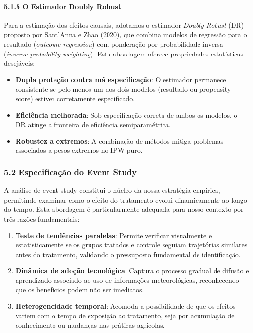 \documentclass[
  brazilian,
  12pt,
  a4paper,
]{article}
\providecommand{\tightlist}{%
  \setlength{\itemsep}{0pt}\setlength{\parskip}{0pt}}
\begin{document}
\paragraph{\texorpdfstring{\textbf{5.1.5 O Estimador Doubly
Robust}}{5.1.5 O Estimador Doubly Robust}}\label{o-estimador-doubly-robust}

Para a estimação dos efeitos causais, adotamos o estimador \emph{Doubly
Robust} (DR) proposto por Sant'Anna e Zhao (2020), que combina modelos
de regressão para o resultado (\emph{outcome regression}) com ponderação
por probabilidade inversa (\emph{inverse probability weighting}). Esta
abordagem oferece propriedades estatísticas desejáveis:

\begin{itemize}
\tightlist
\item
  \textbf{Dupla proteção contra má especificação}: O estimador permanece
  consistente se pelo menos um dos dois modelos (resultado ou propensity
  score) estiver corretamente especificado.
\item
  \textbf{Eficiência melhorada}: Sob especificação correta de ambos os
  modelos, o DR atinge a fronteira de eficiência semiparamétrica.
\item
  \textbf{Robustez a extremos}: A combinação de métodos mitiga problemas
  associados a pesos extremos no IPW puro.
\end{itemize}

\subsubsection{\texorpdfstring{\textbf{5.2 Especificação do Event
Study}}{5.2 Especificação do Event Study}}\label{especificauxe7uxe3o-do-event-study}

A análise de event study constitui o núcleo da nossa estratégia
empírica, permitindo examinar como o efeito do tratamento evolui
dinamicamente ao longo do tempo. Esta abordagem é particularmente
adequada para nosso contexto por três razões fundamentais:

\begin{enumerate}
\def\labelenumi{\arabic{enumi}.}
\item
  \textbf{Teste de tendências paralelas}: Permite verificar visualmente
  e estatisticamente se os grupos tratados e controle seguiam
  trajetórias similares antes do tratamento, validando o pressuposto
  fundamental de identificação.
\item
  \textbf{Dinâmica de adoção tecnológica}: Captura o processo gradual de
  difusão e aprendizado associado ao uso de informações meteorológicas,
  reconhecendo que os benefícios podem não ser imediatos.
\item
  \textbf{Heterogeneidade temporal}: Acomoda a possibilidade de que os
  efeitos variem com o tempo de exposição ao tratamento, seja por
  acumulação de conhecimento ou mudanças nas práticas agrícolas.
\end{enumerate}
\end{document}
